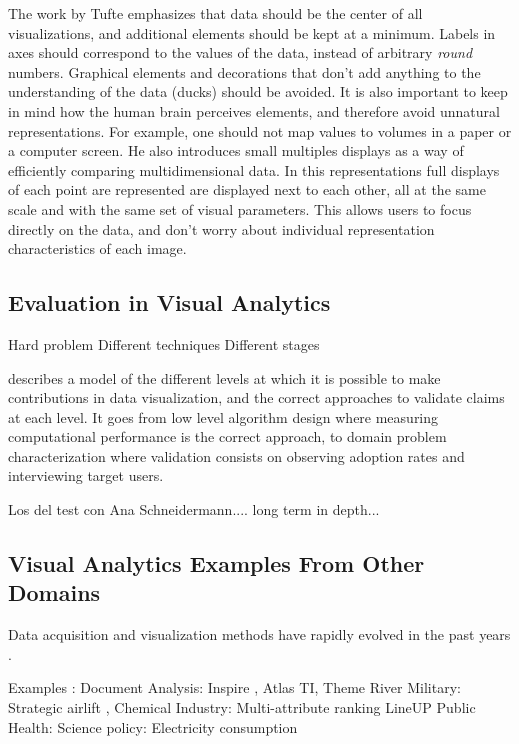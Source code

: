 The work by Tufte \autocite{tufte_visual_1983} emphasizes that data should be the center of all visualizations, and additional elements should be kept at a minimum. Labels in axes should correspond to the values of the data, instead of arbitrary \emph{round} numbers. Graphical elements and decorations that don't add anything to the understanding of the data (ducks) should be avoided. It is also important to keep in mind how the human brain perceives elements, and therefore avoid unnatural representations. For example, one should not map values to volumes in a paper or a computer screen. He also introduces small multiples displays as a way of efficiently comparing multidimensional data. In this representations full displays of each point are represented are displayed next to each other, all at the same scale and with the same set of visual parameters. This allows users to focus directly on the data, and don't worry about individual representation characteristics of each image.


\subsection{Evaluation in Visual Analytics}

Hard problem
Different techniques
Different stages

\autocite{munzner_nested_2009} describes a model of the different levels at which it is possible to make contributions in data visualization, and the correct approaches to validate claims at each level. It goes from low level algorithm design where measuring computational performance is the correct approach, to domain problem characterization where validation consists on observing adoption rates and interviewing target users.

Los del test con Ana
Schneidermann.... long term in depth...

\subsection{Visual Analytics Examples From Other Domains}

Data acquisition and visualization methods have rapidly evolved in the past years \autocite{botha_individual_2012}.

Examples : 
Document Analysis: Inspire \autocite{hetzler_analysis_2004}, Atlas TI, Theme River \autocite{themerivertm:_2002}
Military: Strategic airlift \autocite{soban_visual_2011},
Chemical Industry: \autocite{stahl_overview_2013}
Multi-attribute ranking LineUP \autocite{gratzl_lineup:_2013}
Public Health: \autocite{sedig_challenge_2014}
Science policy: \autocite{mcinerny_information_2014}
Electricity consumption \autocite{janetzko_anomaly_2014}

